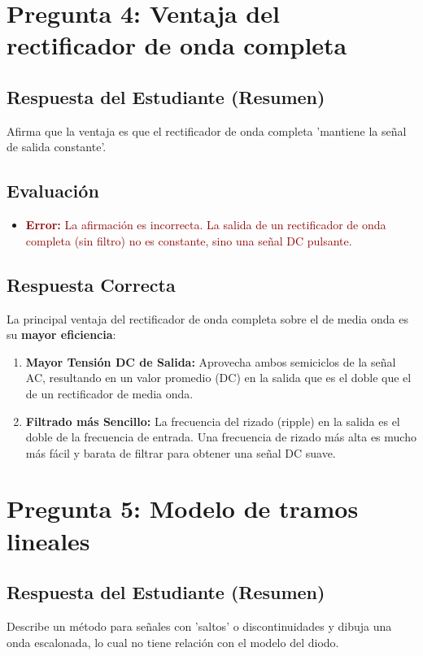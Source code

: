 \documentclass[12pt, a4paper]{article}
\newcommand{\error}[1]{\textcolor{darkred}{\textbf{Error:} #1}}
\begin{document}
\newpage

\section{Pregunta 4: Ventaja del rectificador de onda completa}

\subsection*{Respuesta del Estudiante (Resumen)}
Afirma que la ventaja es que el rectificador de onda completa 'mantiene la señal de salida constante'.

\subsection*{Evaluación}
\begin{itemize}
    \item \error{La afirmación es incorrecta. La salida de un rectificador de onda completa (sin filtro) no es constante, sino una señal DC pulsante.}
\end{itemize}

\subsection*{Respuesta Correcta}
La principal ventaja del rectificador de onda completa sobre el de media onda es su \textbf{mayor eficiencia}:
\begin{enumerate}
    \item \textbf{Mayor Tensión DC de Salida:} Aprovecha ambos semiciclos de la señal AC, resultando en un valor promedio (DC) en la salida que es el doble que el de un rectificador de media onda.
    \item \textbf{Filtrado más Sencillo:} La frecuencia del rizado (ripple) en la salida es el doble de la frecuencia de entrada. Una frecuencia de rizado más alta es mucho más fácil y barata de filtrar para obtener una señal DC suave.
\end{enumerate}

\section{Pregunta 5: Modelo de tramos lineales}

\subsection*{Respuesta del Estudiante (Resumen)}
Describe un método para señales con 'saltos' o discontinuidades y dibuja una onda escalonada, lo cual no tiene relación con el modelo del diodo.
\end{document}

